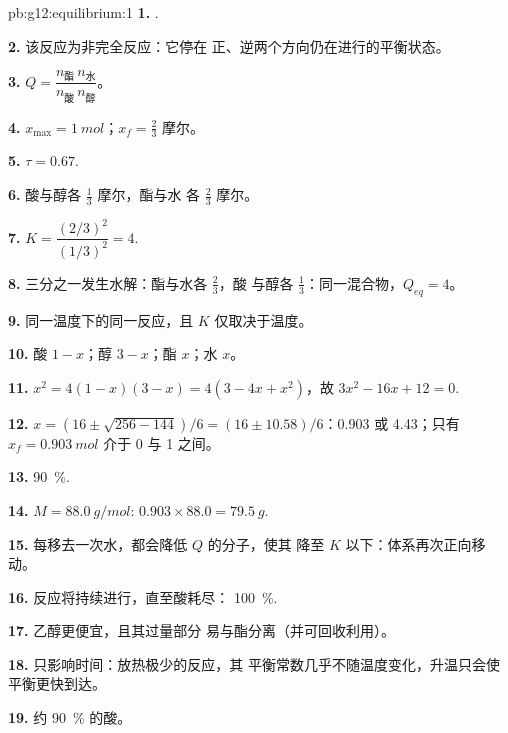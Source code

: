 \begin{solution}{pb:g12:equilibrium:1}
\textbf{1.} .

\textbf{2.} 该反应为非完全反应：它停在
正、逆两个方向仍在进行的平衡状态。

\textbf{3.} $Q = \dfrac{n_{\text{酯}}\, n_{\text{水}}}{n_{\text{酸}}\, n_{\text{醇}}}$。

\textbf{4.} $x_{\max} = \qty{1}{mol}$；$x_f = \frac{2}{3}$ 摩尔。

\textbf{5.} $\tau = 0.67$.

\textbf{6.} 酸与醇各 $\frac{1}{3}$ 摩尔，酯与水
各 $\frac{2}{3}$ 摩尔。

\textbf{7.} $K = \dfrac{(2/3)^2}{(1/3)^2} = 4$.

\textbf{8.} 三分之一发生水解：酯与水各 $\frac{2}{3}$，酸
与醇各 $\frac{1}{3}$：同一混合物，$Q_{eq} = 4$。

\textbf{9.} 同一温度下的同一反应，且 $K$
仅取决于温度。

\textbf{10.} 酸 $1 - x$；醇 $3 - x$；酯 $x$；水 $x$。

\textbf{11.} $x^2 = 4(1 - x)(3 - x) = 4(3 - 4x + x^2)$，故
$3x^2 - 16x + 12 = 0$.

\textbf{12.} $x = (16 \pm \sqrt{256 - 144})/6 = (16 \pm 10.58)/6$：0.903
或 4.43；只有 $x_f = \qty{0.903}{mol}$ 介于 0 与 1 之间。

\textbf{13.} \qty{90}{\percent}.

\textbf{14.} $M = \qty{88.0}{g/mol}$: $0.903 \times 88.0 = \qty{79.5}{g}$.

\textbf{15.} 每移去一次水，都会降低 $Q$ 的分子，使其
降至 $K$ 以下：体系再次正向移动。

\textbf{16.} 反应将持续进行，直至酸耗尽：
\qty{100}{\percent}.

\textbf{17.} 乙醇更便宜，且其过量部分
易与酯分离（并可回收利用）。

\textbf{18.} 只影响时间：放热极少的反应，其
平衡常数几乎不随温度变化，升温只会使
平衡更快到达。

\textbf{19.} 约 \qty{90}{\percent} 的酸。
\end{solution}
